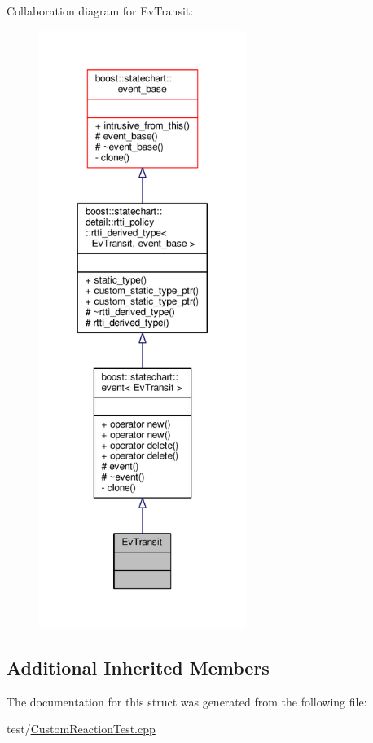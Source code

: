 Collaboration diagram for Ev\+Transit\+:
\nopagebreak
\begin{figure}[H]
\begin{center}
\leavevmode
\includegraphics[height=550pt]{struct_ev_transit__coll__graph}
\end{center}
\end{figure}
\subsection*{Additional Inherited Members}


The documentation for this struct was generated from the following file\+:\begin{DoxyCompactItemize}
\item 
test/\mbox{\hyperlink{_custom_reaction_test_8cpp}{Custom\+Reaction\+Test.\+cpp}}\end{DoxyCompactItemize}

